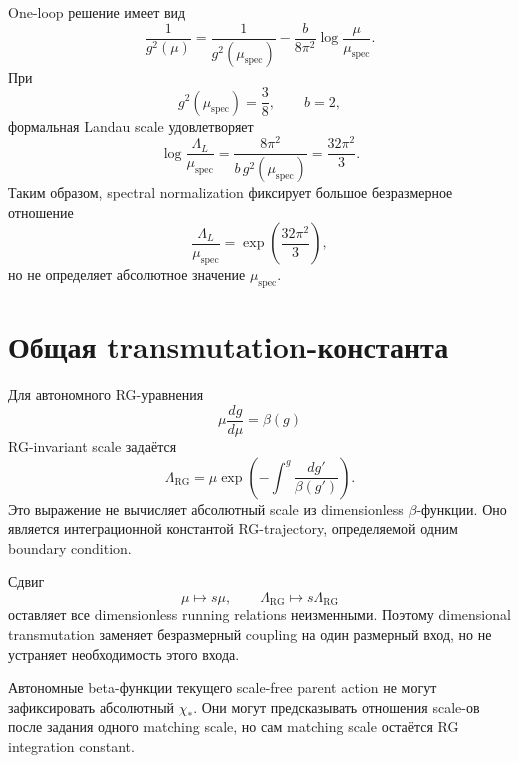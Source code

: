 One-loop решение имеет вид
\begin{equation}
 \frac1{g^2(\mu)}
 =
 \frac1{g^2(\mu_{\mathrm{spec}})}
 -\frac{b}{8\pi^2}
 \log\frac{\mu}{\mu_{\mathrm{spec}}}.
\end{equation}
При
\begin{equation}
 g^2(\mu_{\mathrm{spec}})=\frac38,
 \qquad b=2,
\end{equation}
формальная Landau scale удовлетворяет
\begin{equation}
 \log\frac{\Lambda_L}{\mu_{\mathrm{spec}}}
 =
 \frac{8\pi^2}{b\,g^2(\mu_{\mathrm{spec}})}
 =\frac{32\pi^2}{3}.
\end{equation}
Таким образом, spectral normalization фиксирует большое безразмерное
отношение
\begin{equation}
 \frac{\Lambda_L}{\mu_{\mathrm{spec}}}
 =\exp\left(\frac{32\pi^2}{3}\right),
\end{equation}
но не определяет абсолютное значение \(\mu_{\mathrm{spec}}\).

\section{Общая transmutation-константа}

Для автономного RG-уравнения
\begin{equation}
 \mu\frac{dg}{d\mu}=\beta(g)
\end{equation}
RG-invariant scale задаётся
\begin{equation}
 \Lambda_{\mathrm{RG}}
 =
 \mu
 \exp\left(
 -\int^g\frac{dg'}{\beta(g')}
 \right).
\end{equation}
Это выражение не вычисляет абсолютный scale из dimensionless
\(\beta\)-функции. Оно является интеграционной константой RG-trajectory,
определяемой одним boundary condition.

Сдвиг
\begin{equation}
 \mu\longmapsto s\mu,
 \qquad
 \Lambda_{\mathrm{RG}}\longmapsto s\Lambda_{\mathrm{RG}}
\end{equation}
оставляет все dimensionless running relations неизменными. Поэтому
dimensional transmutation заменяет безразмерный coupling на один
размерный вход, но не устраняет необходимость этого входа.

\begin{theorem}
Автономные beta-функции текущего scale-free parent action не могут
зафиксировать абсолютный \(\chi_*\). Они могут предсказывать отношения
scale-ов после задания одного matching scale, но сам matching scale
остаётся RG integration constant.
\end{theorem}

